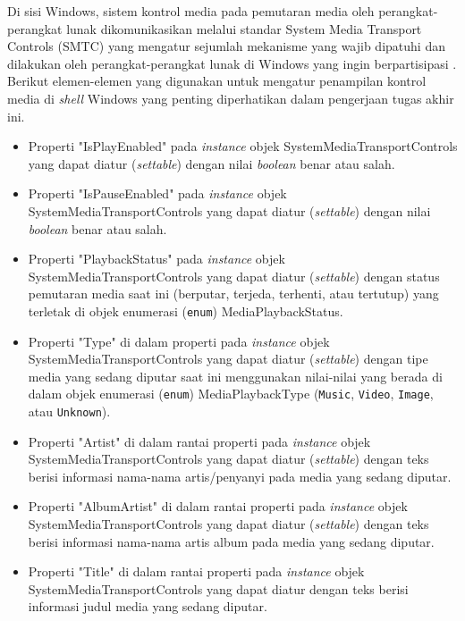Di sisi Windows, sistem kontrol media pada pemutaran media oleh perangkat-perangkat lunak 
dikomunikasikan melalui standar System Media Transport Controls (SMTC) yang mengatur sejumlah mekanisme yang wajib dipatuhi dan dilakukan oleh perangkat-perangkat lunak di Windows yang ingin berpartisipasi \cite{microsoft-docs-manual-control-of-the-smtc}. Berikut elemen-elemen yang digunakan untuk mengatur penampilan kontrol media di \textit{shell} Windows yang penting diperhatikan dalam pengerjaan tugas akhir ini.
\begin{itemize}
    \item Properti "IsPlayEnabled" pada \textit{instance} objek SystemMediaTransportControls yang dapat diatur (\textit{settable}) dengan nilai \textit{boolean} benar atau salah.
    
    \item Properti "IsPauseEnabled" pada \textit{instance} objek SystemMediaTransportControls yang dapat diatur (\textit{settable}) dengan nilai \textit{boolean} benar atau salah.
    
    \item Properti "PlaybackStatus" pada \textit{instance} objek SystemMediaTransportControls yang dapat diatur (\textit{settable}) dengan status pemutaran media saat ini (berputar, terjeda, terhenti, atau tertutup) yang terletak di objek enumerasi (\verb|enum|) MediaPlaybackStatus.
    
    \item Properti "Type" di dalam properti  pada \textit{instance} objek SystemMediaTransportControls yang dapat diatur (\textit{settable}) dengan tipe media yang sedang diputar saat ini menggunakan nilai-nilai yang berada di dalam objek enumerasi (\verb|enum|) MediaPlaybackType (\verb|Music|, \verb|Video|, \verb|Image|, atau \verb|Unknown|).
    
    \item Properti "Artist" di dalam rantai properti  pada \textit{instance} objek SystemMediaTransportControls yang dapat diatur (\textit{settable}) dengan teks berisi informasi nama-nama artis/penyanyi pada media yang sedang diputar.
    
    \item Properti "AlbumArtist" di dalam rantai properti  pada \textit{instance} objek SystemMediaTransportControls yang dapat diatur (\textit{settable}) dengan teks berisi informasi nama-nama artis album pada media yang sedang diputar.
    
    \item Properti "Title" di dalam rantai properti  pada \textit{instance} objek SystemMediaTransportControls yang dapat diatur dengan teks berisi informasi judul media yang sedang diputar.

\end{itemize}

